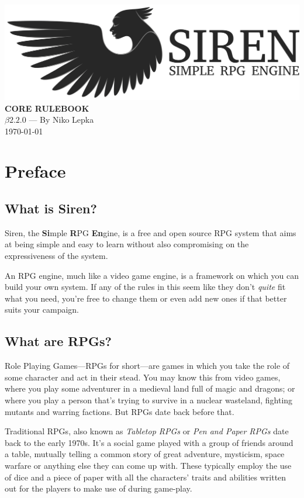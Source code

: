 \documentclass[a4paper]{book}
\begin{document}
\begin{titlepage}
\begin{center}
  \includegraphics[width = \textwidth]{graphics/svg-logo.png}
  \huge{\textbf{CORE RULEBOOK}}\\
  \LARGE{$\beta2.2.0$ --- By Niko Lepka}\\
  \Large{\today}
\end{center}
\end{titlepage}
\thispagestyle{empty} %
\frontmatter %
\chapter*{Preface}
\section*{What is Siren?}
Siren, the \textbf{Si}mple \textbf{R}PG \textbf{En}gine, is a free and open source RPG system that aims at being simple and easy to learn without also compromising on the expressiveness of the system.

An RPG engine, much like a video game engine, is a framework on which you can build your own system. If any of the rules in this seem like they don't \textit{quite} fit what you need, you're free to change them or even add new ones if that better suits your campaign.

\section*{What are RPGs?}
Role Playing Games---RPGs for short---are games in which you take the role of some character and act in their stead.
You may know this from video games, where you play some adventurer in a medieval land full of magic and dragons; or where you play a person that's trying to survive in a nuclear wasteland, fighting mutants and warring factions.
But RPGs date back before that.

Traditional RPGs, also known as \textit{Tabletop RPGs} or \textit{Pen and Paper RPGs} date back to the early 1970s.
It's a social game played with a group of friends around a table, mutually telling a common story of great adventure, mysticism, space warfare or anything else they can come up with.
These typically employ the use of dice and a piece of paper with all the characters' traits and abilities written out for the players to make use of during game-play.
\end{document}
